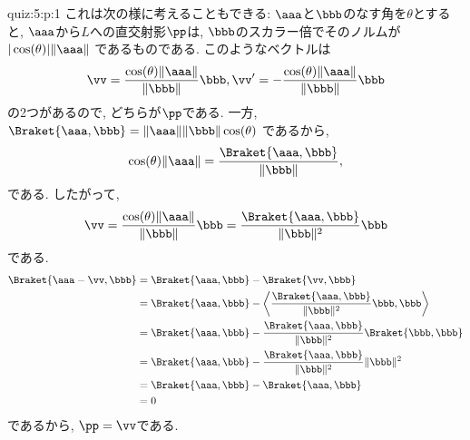 \begin{answerof}{quiz:5:p:1}
これは次の様に考えることもできる:
$\aaa$と$\bbb$のなす角を$\theta$とすると,
$\aaa$から$L$への直交射影$\pp$は,
$\bbb$のスカラー倍でそのノルムが$|\cos(\theta)|\|\aaa\|$
であるものである.
このようなベクトルは
\begin{align*}
  \vv=\frac{\cos(\theta)\|\aaa\|}{\|\bbb\|}\bbb,
  \vv'=-\frac{\cos(\theta)\|\aaa\|}{\|\bbb\|}\bbb
\end{align*}
の2つがあるので,
どちらが$\pp$である.
一方, $\Braket{\aaa,\bbb}=\|\aaa\|\|\bbb\|\cos(\theta)$
であるから,
\begin{align*}
  \cos(\theta)\|\aaa\|=\frac{\Braket{\aaa,\bbb}}{\|\bbb\|},
\end{align*}
である.
したがって,
\begin{align*}
  \vv=\frac{\cos(\theta)\|\aaa\|}{\|\bbb\|}\bbb=
  \frac{\Braket{\aaa,\bbb}}{\|\bbb\|^2}\bbb
\end{align*}
である. 
\begin{align*}
  \Braket{\aaa-\vv,\bbb}
  &=
  \Braket{\aaa,\bbb}-\Braket{\vv,\bbb}\\
  &=\Braket{\aaa,\bbb}-\left\langle\frac{\Braket{\aaa,\bbb}}{\|\bbb\|^2}\bbb,\bbb\right\rangle\\
  &=\Braket{\aaa,\bbb}-\frac{\Braket{\aaa,\bbb}}{\|\bbb\|^2}\Braket{\bbb,\bbb}\\
  &=\Braket{\aaa,\bbb}-\frac{\Braket{\aaa,\bbb}}{\|\bbb\|^2}\|\bbb\|^2\\
  &=\Braket{\aaa,\bbb}-\Braket{\aaa,\bbb}\\
  &=0
\end{align*}
であるから, $\pp=\vv$である.


\end{answerof}
